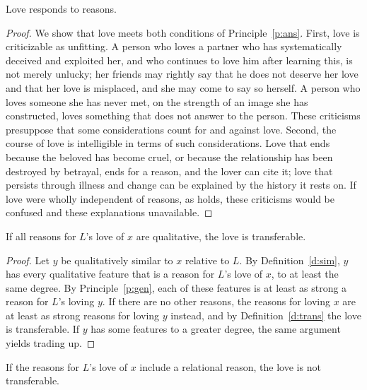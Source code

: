 \documentclass{situationist-preprint}
\begin{document}
\begin{lemma}\label{l:resp}
Love responds to reasons.
\end{lemma}

\begin{proof}
We show that love meets both conditions of Principle~\ref{p:ans}. First, love is criticizable as unfitting. A person who loves a partner who has systematically deceived and exploited her, and who continues to love him after learning this, is not merely unlucky; her friends may rightly say that he does not deserve her love and that her love is misplaced, and she may come to say so herself. A person who loves someone she has never met, on the strength of an image she has constructed, loves something that does not answer to the person. These criticisms presuppose that some considerations count for and against love. Second, the course of love is intelligible in terms of such considerations. Love that ends because the beloved has become cruel, or because the relationship has been destroyed by betrayal, ends for a reason, and the lover can cite it; love that persists through illness and change can be explained by the history it rests on. If love were wholly independent of reasons, as \citet{Frankfurt2004} holds, these criticisms would be confused and these explanations unavailable.
\end{proof}

\begin{lemma}\label{l:qual}
If all reasons for $L$'s love of $x$ are qualitative, the love is transferable.
\end{lemma}

\begin{proof}
Let $y$ be qualitatively similar to $x$ relative to $L$. By Definition~\ref{d:sim}, $y$ has every qualitative feature that is a reason for $L$'s love of $x$, to at least the same degree. By Principle~\ref{p:gen}, each of these features is at least as strong a reason for $L$'s loving $y$. If there are no other reasons, the reasons for loving $x$ are at least as strong reasons for loving $y$ instead, and by Definition~\ref{d:trans} the love is transferable. If $y$ has some features to a greater degree, the same argument yields trading up.
\end{proof}

\begin{lemma}\label{l:rel}
If the reasons for $L$'s love of $x$ include a relational reason, the love is not transferable.
\end{lemma}
\end{document}
